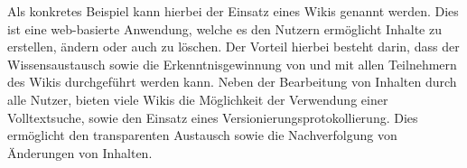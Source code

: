 Als konkretes Beispiel kann hierbei der Einsatz eines Wikis genannt werden. Dies ist eine web-basierte Anwendung, welche es den Nutzern ermöglicht Inhalte zu erstellen, ändern oder auch zu löschen. Der Vorteil hierbei besteht darin, dass der Wissensaustausch sowie die Erkenntnisgewinnung von und mit allen Teilnehmern des Wikis durchgeführt werden kann. Neben der Bearbeitung von Inhalten durch alle Nutzer, bieten viele Wikis die Möglichkeit der Verwendung einer Volltextsuche, sowie den Einsatz eines Versionierungsprotokollierung. Dies ermöglicht den transparenten Austausch sowie die Nachverfolgung von Änderungen von Inhalten. \cite[S. 75f.]{Mertins.2009}

